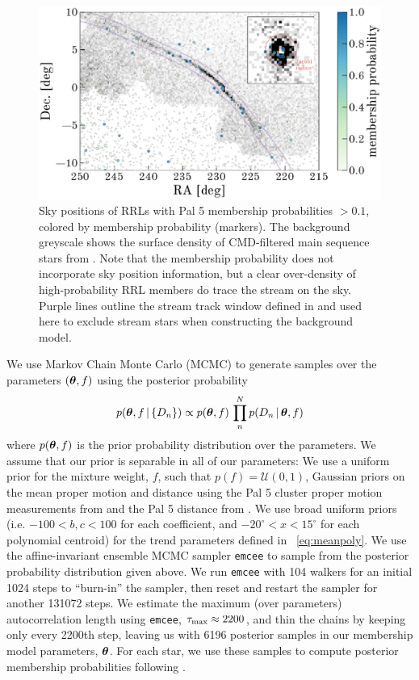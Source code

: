 \documentclass[twocolumn]{aastex63}
\begin{document}
\begin{figure}[t]
\begin{center}
\includegraphics[width=\textwidth]{members.pdf}
\caption{Sky positions of RRLs with Pal 5 membership probabilities $>0.1$, colored by membership probability (markers).
The background greyscale shows the surface density of CMD-filtered main sequence stars from \citet{Bonaca:2019}.
Note that the membership probability does not incorporate sky position information, but a clear over-density of high-probability RRL members do trace the stream on the sky.
Purple lines outline the stream track window defined in \citet{Bonaca:2019} and used here to exclude stream stars when constructing the background model.}
\label{fig:members}
\end{center}
\end{figure}

We use Markov Chain Monte Carlo (MCMC) to generate samples over the parameters $(\boldsymbol{\theta}, f)$ using the posterior probability
\begin{equation}
    p(\bs{\theta}, f \given \{D_n\}) \propto p(\bs{\theta}, f) \, \prod_n^N p(D_n \given \bs{\theta}, f)
\end{equation}
where $p(\boldsymbol{\theta}, f)$ is the prior probability distribution over the parameters.
We assume that our prior is separable in all of our parameters: We use a uniform prior for the mixture weight, $f$, such that $p(f) = \mathcal{U}(0, 1)$, Gaussian priors on the mean proper motion and distance using the Pal 5 cluster proper motion measurements from \citet{Vasiliev:2019} and the Pal 5 distance from \citet{Kuepper:2015}.
We use broad uniform priors (i.e. $-100 < b, c < 100$ for each coefficient, and $-20^\circ < x < 15^\circ$ for each polynomial centroid) for the trend parameters defined in \equationname~\ref{eq:meanpoly}.
We use the affine-invariant ensemble MCMC sampler \texttt{emcee} \citep{emcee} to sample from the posterior probability distribution given above.
We run \texttt{emcee} with 104 walkers for an initial 1024 steps to ``burn-in'' the sampler, then reset and restart the sampler for another 131072 steps.
We estimate the maximum (over parameters) autocorrelation length using \texttt{emcee}, $\tau_{\rm max} \approx 2200$, and thin the chains by keeping only every 2200th step, leaving us with 6196 posterior samples in our membership model parameters, $\boldsymbol{\theta}$.
For each star, we use these samples to compute posterior membership probabilities following \citet{DFM:blog}.
\end{document}
